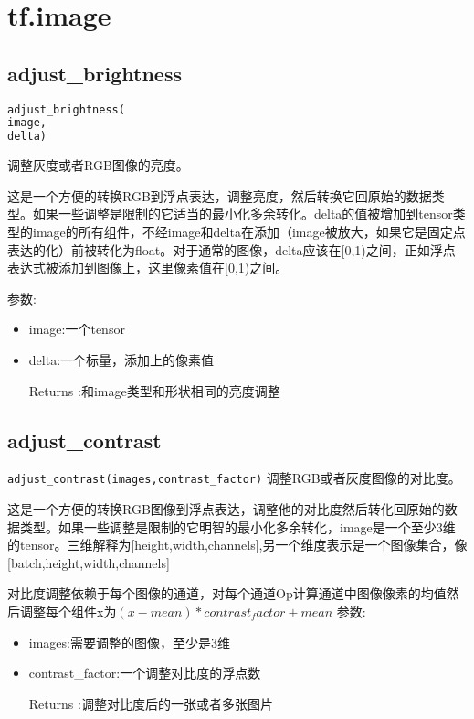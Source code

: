 \section{tf.image}
\subsection{adjust\_brightness}
\begin{lstlisting}[language=Python]
adjust_brightness(
image,
delta)
\end{lstlisting}
调整灰度或者RGB图像的亮度。

这是一个方便的转换RGB到浮点表达，调整亮度，然后转换它回原始的数据类型。如果一些调整是限制的它适当的最小化多余转化。delta的值被增加到tensor类型的image的所有组件，不经image和delta在添加（image被放大，如果它是固定点表达的化）前被转化为float。对于通常的图像，delta应该在[0,1)之间，正如浮点表达式被添加到图像上，这里像素值在[0,1)之间。

参数:
\begin{itemize}
		\item image:一个tensor
		\item delta:一个标量，添加上的像素值
		\item [Returns]:和image类型和形状相同的亮度调整
\end{itemize}
\subsection{adjust\_contrast}
\lstinline[language=Python]{adjust_contrast(images,contrast_factor)}
调整RGB或者灰度图像的对比度。

这是一个方便的转换RGB图像到浮点表达，调整他的对比度然后转化回原始的数据类型。如果一些调整是限制的它明智的最小化多余转化，image是一个至少3维的tensor。三维解释为[height,width,channels],另一个维度表示是一个图像集合，像[batch,height,width,channels]

对比度调整依赖于每个图像的通道，对每个通道Op计算通道中图像像素的均值然后调整每个组件x为$(x-mean)*contrast_factor+mean$
参数:
\begin{itemize}
		\item images:需要调整的图像，至少是3维
		\item contrast\_factor:一个调整对比度的浮点数
		\item[Returns]:调整对比度后的一张或者多张图片
\end{itemize}
